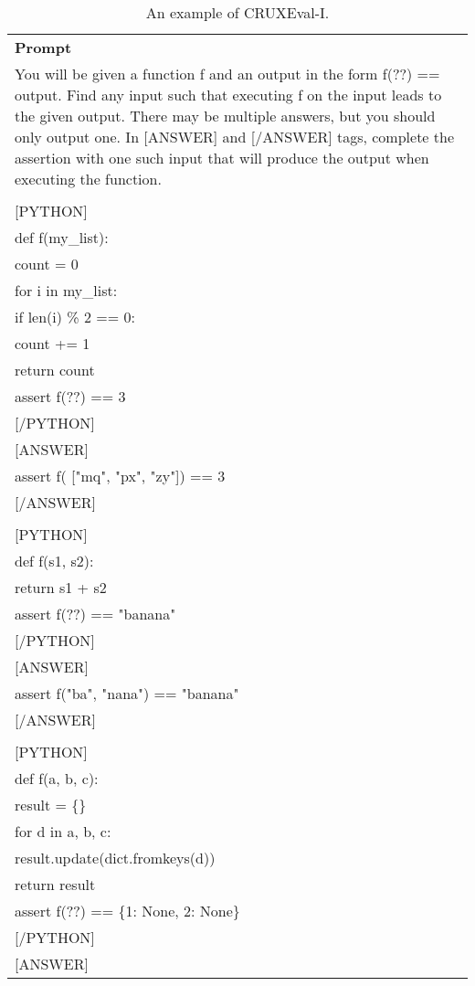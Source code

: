 \begin{table}[ht]
    \centering \small
\begin{tabular}{p{12cm}}
\toprule
\textbf{Prompt}\\
You will be given a function f and an output in the form f(??) == output. Find any input such that executing f on the input leads to the given output. There may be multiple answers, but you should only output one. In 
[ANSWER] and 
[/ANSWER] tags, complete the assertion with one such input that will produce the output when executing the function.\\
\\

[PYTHON]\\
def f(my\_list):\\
    count = 0\\
    for i in my\_list:\\
        if len(i) \% 2 == 0:\\
            count += 1\\
    return count\\
assert f(??) == 3\\

[/PYTHON]\\

[ANSWER]\\
assert f(
["mq", "px", "zy"]) == 3\\

[/ANSWER]\\
\\

[PYTHON]\\
def f(s1, s2):\\
    return s1 + s2\\
assert f(??) == "banana"\\

[/PYTHON]\\

[ANSWER]\\
assert f("ba", "nana") == "banana"\\

[/ANSWER]\\
\\

[PYTHON]\\
def f(a, b, c):\\
    result = \{\}\\
    for d in a, b, c:\\
        result.update(dict.fromkeys(d))\\
    return result\\
assert f(??) == \{1: None, 2: None\}\\

[/PYTHON]\\

[ANSWER]\\
\bottomrule
\end{tabular}
    \caption{\centering An example of CRUXEval-I.}
    \label{tab:CRUXEval_I_eval_format_example}
\end{table}

